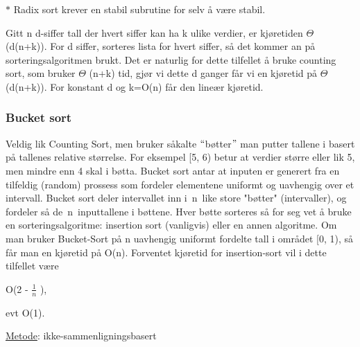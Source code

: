 \documentclass[12pt]{report}
\begin{document}

\par

$\ast$ Radix sort krever en stabil subrutine for selv å være stabil.\par


\vspace{\baselineskip}
\setlength{\parskip}{6.0pt}
Gitt n d-siffer tall der hvert siffer kan ha k ulike verdier, er kjøretiden $ \Theta $ (d(n+k)). For d siffer, sorteres lista for hvert siffer, så det kommer an på sorteringsalgoritmen brukt. Det er naturlig for dette tilfellet å bruke counting sort, som bruker $ \Theta $ (n+k) tid, gjør vi dette d ganger får vi en kjøretid på $ \Theta $ (d(n+k)). For konstant d og k=O(n) får den lineær kjøretid.


\newpage
\par

\subsubsection*{Bucket sort}
\setlength{\parskip}{0.0pt}
Veldig lik Counting Sort, men bruker såkalte $``$bøtter$"$  man putter tallene i basert på tallenes relative størrelse. For eksempel [5, 6) betur at verdier større eller lik 5, men mindre enn 4 skal i bøtta. Bucket sort antar at inputen er generert fra en tilfeldig (random) prossess som fordeler elementene uniformt og uavhengig over et intervall. Bucket sort deler intervallet inn i n like store "bøtter" (intervaller), og fordeler så de n inputtallene i bøttene. Hver bøtte sorteres så for seg vet å bruke en sorteringsalgoritme: insertion sort (vanligvis) eller en annen algoritme. Om man bruker Bucket-Sort på n uavhengig uniformt fordelte tall i området [0, 1), så får man en kjøretid på O(n). Forventet kjøretid for insertion-sort vil i dette tilfellet være {\fontsize{11pt}{13.2pt}\selectfont O(2 -  \( \frac{1}{n} \) ),\par} evt O(1).\par

\uline{Metode}: ikke-sammenligningsbasert\par



\end{document}
